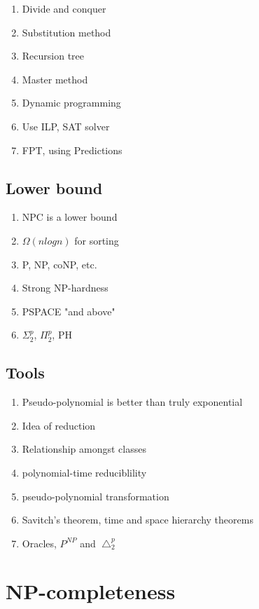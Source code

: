 \documentclass[12pt]{article}
\begin{document}
\begin{enumerate}
    \item Divide and conquer
    \item Substitution method
    \item Recursion tree
    \item Master method
    \item Dynamic programming
    \item Use ILP, SAT solver
    \item FPT, using Predictions
\end{enumerate}

\subsection{Lower bound}

\begin{enumerate}
    \item NPC is a lower bound
    \item $\Omega(nlogn)$ for sorting
    \item P, NP, coNP, etc.
    \item Strong NP-hardness
    \item PSPACE "and above"
    \item $\Sigma_2^p$, $\Pi_2^p$, {PH}
\end{enumerate}

\subsection{Tools}

\begin{enumerate}
    \item Pseudo-polynomial is better than truly exponential 
    \item Idea of reduction
    \item Relationship amongst classes
    \item polynomial-time reduciblility
    \item pseudo-polynomial transformation
    \item Savitch's theorem, time and space hierarchy theorems
    \item Oracles, $P^{NP}$ and $\bigtriangleup _2^p$
\end{enumerate}

\section{NP-completeness}
\end{document}
